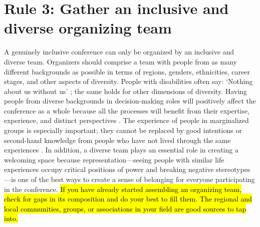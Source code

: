 \documentclass[10pt,letterpaper]{article}
\begin{document}
\section*{Rule 3: Gather an inclusive and diverse organizing team}
\label{rule_organizing_team}

A genuinely inclusive conference can only be organized by an inclusive and diverse team.
Organizers should comprise a team with people from as many different backgrounds as possible in terms of regions, genders, ethnicities, career stages, and other aspects of diversity.
People with disabilities often say: `Nothing about us without us' \cite{charlton_nothing_1998, werner_nothing_1998}; the same holds for other dimensions of diversity. 
Having people from diverse backgrounds in decision-making roles will positively affect the conference as a whole because all the processes will benefit from their expertise, experience, and distinct perspectives \cite{hongGroupsDiverseProblem2004}. 
The experience of people in marginalized groups
is especially important; they cannot be replaced by good intentions or second-hand knowledge from people who have not lived through the same experiences \cite{costanzachockDesign2020}.
In addition, a diverse team plays an essential role in creating a welcoming space because representation—seeing people with similar life experiences occupy critical positions of power and breaking negative stereotypes—is one of the best ways to create a sense of belonging for everyone participating in the conference.
\hl{If you have already started assembling an organizing team, check for gaps in its composition and do your best to fill them. 
The regional and local communities, groups, or associations in your field are good sources to tap into.}
\end{document}
